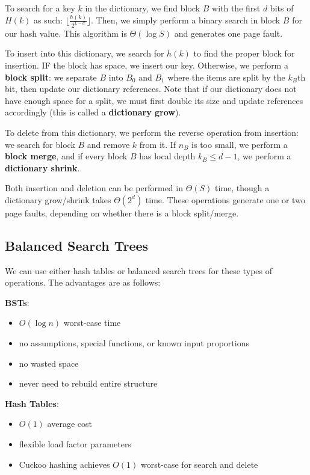 \documentclass[12pt]{article}
\begin{document}
To search for a key $k$ in the dictionary, we find block $B$ with the first $d$ bits of $H(k)$ as such: $\lfloor \frac{h(k)}{2^{L-d}} \rfloor$. Then, we simply perform a binary search in block $B$ for our hash value. This algorithm is $\Theta(\log S)$ and generates one page fault.

To insert into this dictionary, we search for $h(k)$ to find the proper block for insertion. IF the block has space, we insert our key. Otherwise, we perform a {\bf block split}: we separate $B$ into $B_0$ and $B_1$ where the items are split by the $k_B$th bit, then update our dictionary references. Note that if our dictionary does not have enough space for a split, we must first double its size and update references accordingly (this is called a {\bf dictionary grow}).

To delete from this dictionary, we perform the reverse operation from insertion: we search for block $B$ and remove $k$ from it. If $n_B$ is too small, we perform a {\bf block merge}, and if every block $B$ has local depth $k_B \leq d - 1$, we perform a {\bf dictionary shrink}.

Both insertion and deletion can be performed in $\Theta(S)$ time, though a dictionary grow/shrink takes $\Theta(2^d)$ time. These operations generate one or two page faults, depending on whether there is a block split/merge.

\subsection{Balanced Search Trees}
We can use either hash tables or balanced search trees for these types of operations. The advantages are as follows:

{\bf BSTs}:
\begin{itemize}
\item $O(\log n)$ worst-case time
\item no assumptions, special functions, or known input proportions
\item no wasted space
\item never need to rebuild entire structure
\end{itemize}

{\bf Hash Tables}:
\begin{itemize}
\item $O(1)$ average cost
\item flexible load factor parameters
\item Cuckoo hashing achieves $O(1)$ worst-case for search and delete
\end{itemize}
\end{document}

